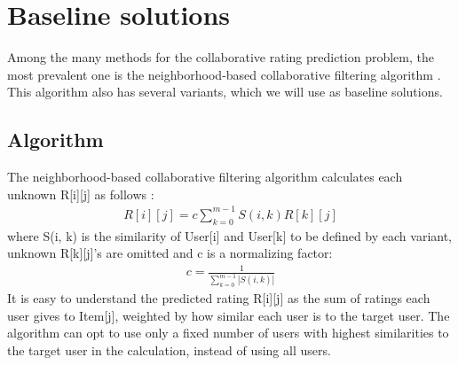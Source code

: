 \documentclass[12pt]{WSUThesis}
\theoremstyle{definition}
\begin{document}
\section{Baseline solutions}
Among the many methods for the collaborative rating prediction problem,
the most prevalent one is the neighborhood-based collaborative filtering 
algorithm \cite{su2009survey}.
This algorithm also has several variants,
which we will use as baseline solutions.

\subsection{Algorithm}
The neighborhood-based collaborative filtering algorithm calculates each 
unknown R[i][j] as 
follows \cite{su2009survey}:
\begin{align*}
R[i][j] = c \sum_{k = 0}^{m-1} S(i, k) R[k][j]
\end{align*}
where S(i, k) is the similarity of User[i] and User[k] to be defined by each 
variant,
unknown R[k][j]'s are omitted and c is a normalizing factor:
\begin{align*}
c = \frac{1}{\sum_{k = 0}^{m - 1} |S(i, k)|}
\end{align*}
It is easy to understand the predicted rating R[i][j] as 
the sum of ratings each user gives to Item[j],
weighted by how similar each user is to the target user.
The algorithm can opt to use only a fixed number of users with highest 
similarities to the target user in the calculation, instead of using all users.
\end{document}
